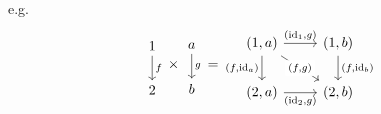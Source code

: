 e.g.
\[
\begin{tikzcd}
	1 \\
	2
	\arrow["f", from=1-1, to=2-1]
\end{tikzcd}
\times
\begin{tikzcd}
	a \\
	b
	\arrow["g", from=1-1, to=2-1]
\end{tikzcd}
=
\begin{tikzcd}
	{(1,a)} & {(1,b)} \\
	{(2,a)} & {(2,b)}
	\arrow["{(\mathrm{id}_1,g)}", from=1-1, to=1-2]
	\arrow["{(f,\mathrm{id}_a)}"', from=1-1, to=2-1]
	\arrow["{(\mathrm{id}_2,g)}"', from=2-1, to=2-2]
	\arrow["{(f,\mathrm{id}_b)}", from=1-2, to=2-2]
	\arrow["{(f,g)}"{description}, from=1-1, to=2-2]
\end{tikzcd}
\]